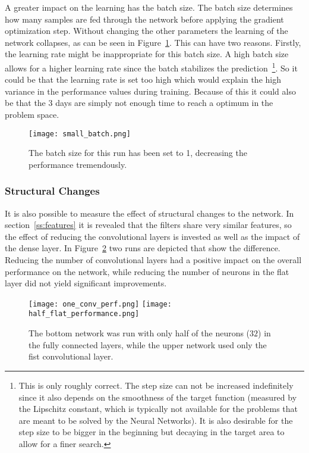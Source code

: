 \documentclass[main.tex]{subfiles}
\begin{document}
A greater impact on the learning has the batch size. The batch size determines how many samples are fed through the network before applying the gradient optimization step. Without changing the other parameters the learning of the network collapses, as can be seen in Figure~\ref{fig:small_batch}. This can have two reasons. Firstly, the learning rate might be inappropriate for this batch size. A high batch size allows for a higher learning rate since the batch stabilizes the prediction~\footnote{This is only roughly correct. The step size can not be increased indefinitely since it also depends on the smoothness of the target function (measured by the Lipschitz constant, which is typically not available for the problems that are meant to be solved by the Neural Networks). It is also desirable for the step size to be bigger in the beginning but decaying in the target area to allow for a finer search.}. So it could be that the learning rate is set too high which would explain the high variance in the performance values during training. Because of this it could also be that the 3 days are simply not enough time to reach a optimum in the problem space.

\begin{figure}[H]
\begin{center}
\texttt{[image: small\_batch.png]}
\end{center}
\caption{The batch size for this run has been set to 1, decreasing the performance tremendously.}
\label{fig:small_batch}
\end{figure}

\subsubsection{Structural Changes}\label{sss:struct_changes}
 
It is also possible to measure the effect of structural changes to the network. In section~\ref{ss:features} it is revealed that the filters share very similar features, so the effect of reducing the convolutional layers is invested as well as the impact of the dense layer. In Figure~\ref{fig:structure_change} two runs are depicted that show the difference. Reducing the number of convolutional layers had a positive impact on the overall performance on the network, while reducing the number of neurons in the flat layer did not yield significant improvements.


\begin{figure}[H]
\begin{center}
\texttt{[image: one\_conv\_perf.png]}
\texttt{[image: half\_flat\_performance.png]}
\end{center}
\caption{The bottom network was run with only half of the neurons ($32$) in the fully connected layers, while the upper network used only the fist convolutional layer.}
\label{fig:structure_change}
\end{figure}
\end{document}
